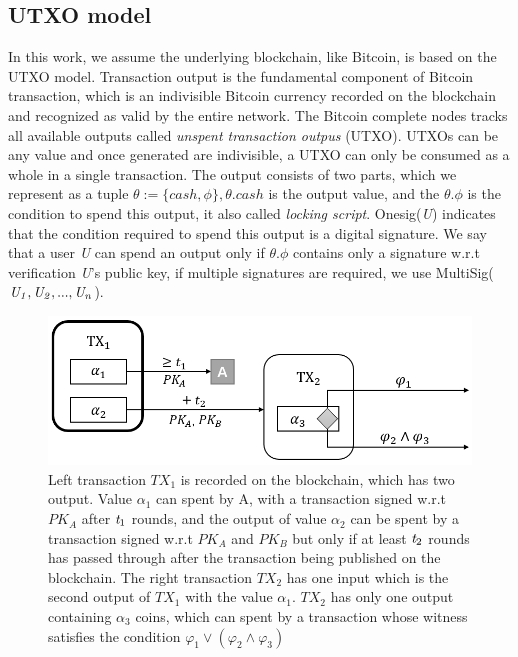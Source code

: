 \documentclass[conference]{IEEEtran}
\begin{document}
\subsection{UTXO model}
In this work, we assume the underlying blockchain, like Bitcoin, is based on the UTXO model. Transaction output is the fundamental component of Bitcoin transaction, which is an indivisible Bitcoin currency recorded on the blockchain and recognized as valid by the entire network. The Bitcoin complete nodes tracks all available outputs called \emph{unspent transaction outpus} (UTXO). UTXOs can be any value and once generated are indivisible, a UTXO can only be consumed as a whole in a single transaction. 
The output consists of two parts, which we represent as a tuple $\theta :=\{cash,\phi\}, \theta.cash$ is the output value, and the $\theta.\phi$ is the condition to spend this output, it also called \emph{locking script}. Onesig(\emph{U}) indicates that the condition required to spend this output is a digital signature. We say that a user \emph{U} can spend an output only if $\theta.\phi$ contains only a signature w.r.t verification  \emph{U}'s public key, if multiple signatures are required, we use 
MultiSig($\it U_1,U_2,...,U_n$).

\begin{figure}[t]
	\centering
	\includegraphics[scale=0.5]{fig2.png}
	\caption{Left transaction $TX_1$ is recorded on the blockchain, which has two output. Value $\alpha_1$ can spent by A, with a transaction signed w.r.t $PK_A$ after $\emph{t}_1$ rounds, and the output of value $\alpha_2$ can be spent by a transaction signed w.r.t $PK_A$ and $PK_B$ but only if at least $\emph{t}_2$ rounds has passed through after the transaction being published on the blockchain. The
	right transaction $TX_2$ has one input which is the second output of $TX_1$ with the value $\alpha_1$. $TX_2$ has only one output containing $\alpha_3$ coins, which can spent by a transaction whose witness satisfies the condition $\varphi_1 \vee (\varphi_2 \wedge \varphi_3)$}
\end{figure}
\end{document}
